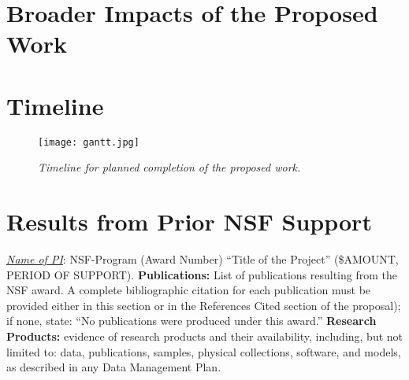 \newpage
\section{Broader Impacts of the Proposed Work}
\label{sec:BI}

\lipsum


\section{Timeline}


\begin{figure}[H]
	\texttt{[image: gantt.jpg]}
	\label{fig:gantt}
	\vspace{-10pt}
	\caption{\textit{Timeline for planned completion of the proposed work.}}
\end{figure}

\lipsum[2]


\section{Results from Prior NSF Support}

\noindent \emph{\underline{Name of PI}}: NSF-Program (Award Number) ``Title of the Project'' (\$AMOUNT, PERIOD OF SUPPORT). 
{\bf Publications:} List of publications resulting from the NSF award. A complete bibliographic citation for each publication must be provided either in this section or in the References Cited section of the proposal); if none, state: ``No publications were produced under this award.'' {\bf Research Products:} evidence of research products and their availability, including, but not limited to: data, publications, samples, physical collections, software, and models, as described in any Data Management Plan.


